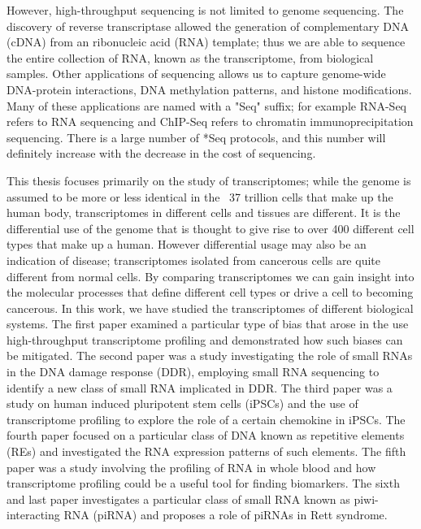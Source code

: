 However, high-throughput sequencing is not limited to genome sequencing. The discovery of reverse transcriptase\cite{pmid4316300, pmid4316301} allowed the generation of complementary DNA (cDNA) from an ribonucleic acid (RNA) template; thus we are able to sequence the entire collection of RNA, known as the transcriptome, from biological samples. Other applications of sequencing allows us to capture genome-wide DNA-protein interactions, DNA methylation patterns, and histone modifications\cite{applicationsofsequencing}. Many of these applications are named with a "Seq" suffix; for example RNA-Seq refers to RNA sequencing and ChIP-Seq refers to chromatin immunoprecipitation sequencing. There is a large number of *Seq protocols\cite{pachter2014seq}, and this number will definitely increase with the decrease in the cost of sequencing.

This thesis focuses primarily on the study of transcriptomes; while the genome is assumed to be more or less identical in the ~37 trillion cells that make up the human body\cite{pmid23829164}, transcriptomes in different cells and tissues are different. It is the differential use of the genome that is thought to give rise to over 400 different cell types that make up a human\cite{pmid16790079}. However differential usage may also be an indication of disease; transcriptomes isolated from cancerous cells are quite different from normal cells. By comparing transcriptomes we can gain insight into the molecular processes that define different cell types or drive a cell to becoming cancerous. In this work, we have studied the transcriptomes of different biological systems. The first paper examined a particular type of bias that arose in the use high-throughput transcriptome profiling and demonstrated how such biases can be mitigated\cite{Tang01022013}. The second paper was a study investigating the role of small RNAs in the DNA damage response (DDR), employing small RNA sequencing to identify a new class of small RNA implicated in DDR\cite{francia2012site}. The third paper was a study on human induced pluripotent stem cells (iPSCs) and the use of transcriptome profiling to explore the role of a certain chemokine in iPSCs. The fourth paper focused on a particular class of DNA known as repetitive elements (REs) and investigated the RNA expression patterns of such elements. The fifth paper was a study involving the profiling of RNA in whole blood and how transcriptome profiling could be a useful tool for finding biomarkers. The sixth and last paper investigates a particular class of small RNA known as piwi-interacting RNA (piRNA) and proposes a role of piRNAs in Rett syndrome.

